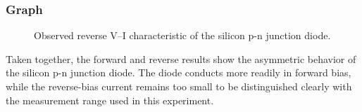 \subsubsection*{Graph}
\begin{figure}[H]
  \centering
  \caption{Observed reverse V--I characteristic of the silicon p-n junction diode.}
  \label{fig:lab2_observed_reverse_vi}
\end{figure}

Taken together, the forward and reverse results show the asymmetric behavior of the
silicon p-n junction diode. The diode conducts more readily in forward bias, while the
reverse-bias current remains too small to be distinguished clearly with the measurement
range used in this experiment.
